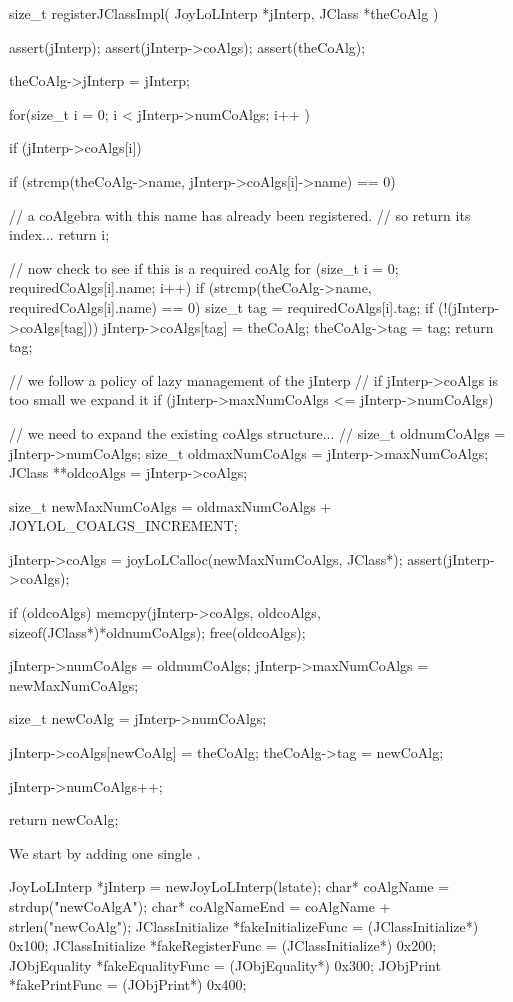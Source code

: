 \startCCode
size_t registerJClassImpl(
  JoyLoLInterp *jInterp,
  JClass       *theCoAlg
) {
  assert(jInterp);
  assert(jInterp->coAlgs);
  assert(theCoAlg);
  
  theCoAlg->jInterp = jInterp;
  
  for(size_t i = 0; i < jInterp->numCoAlgs; i++ ) {
    if (jInterp->coAlgs[i]) {
      if (strcmp(theCoAlg->name,
        jInterp->coAlgs[i]->name) == 0) {
    
        // a coAlgebra with this name has already been registered. 
        // so return its index...
        return i;
      }
    }
  }

  // now check to see if this is a required coAlg
  for (size_t i = 0; requiredCoAlgs[i].name; i++) {
    if (strcmp(theCoAlg->name, requiredCoAlgs[i].name) == 0) {
      size_t tag = requiredCoAlgs[i].tag;
      if (!(jInterp->coAlgs[tag])) {
        jInterp->coAlgs[tag] = theCoAlg;
      }
      theCoAlg->tag = tag;
      return tag;
    }
  }

  // we follow a policy of lazy management of the jInterp
  // if jInterp->coAlgs is too small we expand it
  if (jInterp->maxNumCoAlgs <= jInterp->numCoAlgs) {
    // we need to expand the existing coAlgs structure...
    //  
    size_t oldnumCoAlgs     = jInterp->numCoAlgs;
    size_t oldmaxNumCoAlgs  = jInterp->maxNumCoAlgs;
    JClass **oldcoAlgs = jInterp->coAlgs;
    
    size_t newMaxNumCoAlgs =
      oldmaxNumCoAlgs + JOYLOL_COALGS_INCREMENT;

    jInterp->coAlgs =
      joyLoLCalloc(newMaxNumCoAlgs, JClass*);
    assert(jInterp->coAlgs);
    
    if (oldcoAlgs) {
      memcpy(jInterp->coAlgs,
        oldcoAlgs,
        sizeof(JClass*)*oldnumCoAlgs);
      free(oldcoAlgs);
    }
    
    jInterp->numCoAlgs    = oldnumCoAlgs;
    jInterp->maxNumCoAlgs = newMaxNumCoAlgs;
  }
  
  size_t newCoAlg = jInterp->numCoAlgs;
  
  jInterp->coAlgs[newCoAlg] = theCoAlg;
  theCoAlg->tag             = newCoAlg;
  
  jInterp->numCoAlgs++;
  
  return newCoAlg;
}
\stopCCode


We start by adding one single . 

\startCTest
  JoyLoLInterp *jInterp = newJoyLoLInterp(lstate);
  char*             coAlgName          = strdup("newCoAlgA");
  char*             coAlgNameEnd       = coAlgName + strlen("newCoAlg");
  JClassInitialize *fakeInitializeFunc = (JClassInitialize*) 0x100;
  JClassInitialize *fakeRegisterFunc   = (JClassInitialize*) 0x200;
  JObjEquality     *fakeEqualityFunc   = (JObjEquality*)     0x300;
  JObjPrint        *fakePrintFunc      = (JObjPrint*)        0x400;
  

